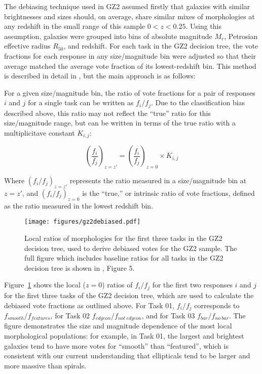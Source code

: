 The debiasing technique used in GZ2 assumed firstly that galaxies with similar brightnesses and sizes should, on average, share similar mixes of morphologies at any redshift in the small range of this sample $0<z<0.25$. Using this assumption, galaxies were grouped into bins of absolute magnitude $M_r$, Petrosian effective radius $R_{50}$, and redshift. For each task in the GZ2 decision tree, the vote fractions for each response in any size/magnitude bin were adjusted so that their average matched the average vote fraction of its lowest-redshift bin. This method is described in detail in \citet{Willett2013}, but the main approach is as follows:

For a given size/magnitude bin, the ratio of vote fractions for a pair of responses $i$ and $j$ for a single task can be written as $f_i/f_j$. Due to the classification bias described above, this ratio may not reflect the ``true'' ratio for this size/magnitude range, but can be written in terms of the true ratio with a multiplicitave constant $K_{i,j}$:

\begin{equation}
\left(\frac{f_i}{f_j}\right)_{z=z'} = \left(\frac{f_i}{f_j}\right)_{z=0} \times K_{i,j}
\label{eqn:fvspk}
\end{equation}

Where $(f_i/f_j)_{z=z'}$ represents the ratio measured in a size/magnitude bin at $z=z'$, and $(f_i/f_j)_{z=0}$ is the ``true,'' or intrinsic ratio of vote fractions, defined as the ratio measured in the lowest redshift bin.

\begin{figure}
\centering
\texttt{[image: figures/gz2debiased.pdf]}
\caption{Local ratios of morphologies for the first three tasks in the GZ2 decision tree, used to derive debiased votes for the GZ2 sample. The full figure which includes baseline ratios for all tasks in the GZ2 decision tree is shown in \citet{Willett2013}, Figure 5.}
\label{fig:gz2debiased}
\end{figure} 

Figure~\ref{fig:gz2debiased} shows the local ($z=0$) ratios of $f_i/f_j$ for the first two responses $i$ and $j$ for the first three tasks of the GZ2 decision tree, which are used to calculate the debiased vote fractions as outlined above. For Task 01, $f_i/f_j$ corresponds to $f_{smooth}/f_{features}$, for Task 02 $f_{edgeon}/f_{not~edgeon}$, and for Task 03 $f_{bar}/f_{no~bar}.$ The figure demonstrates the size and magnitude dependence of the most local morphological populations: for example, in Task 01, the largest and brightest galaxies tend to have more votes for ``smooth'' than ``featured'', which is consistent with our current understanding that ellipticals tend to be larger and more massive than spirals. 


